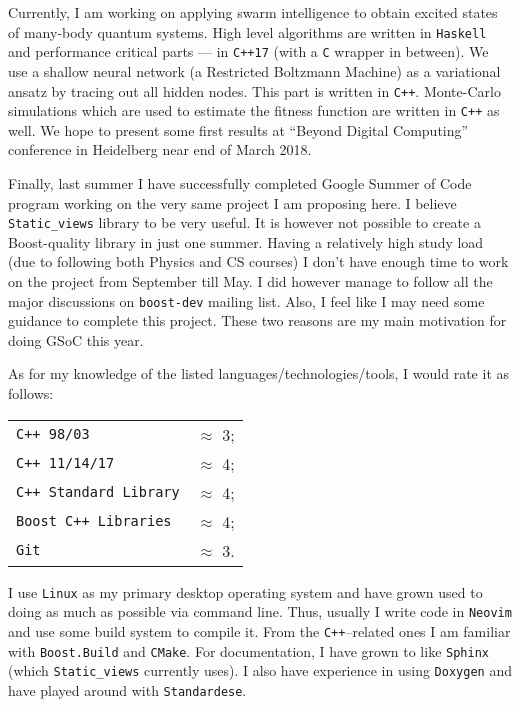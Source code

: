 \documentclass[a4paper,12pt]{article}
\begin{document}
    Currently, I am working on applying swarm intelligence to obtain excited
    states of many-body quantum systems\cite{tcm-swarm}. High level algorithms
    are written in \texttt{Haskell} and performance critical parts --- in
    \texttt{C++17} (with a \texttt{C} wrapper in between). We use a shallow
    neural network (a Restricted Boltzmann Machine) as a variational ansatz by
    tracing out all hidden nodes. This part is written in \texttt{C++}.
    Monte-Carlo simulations which are used to estimate the fitness function are
    written in \texttt{C++} as well. We hope to present some first results at
    ``Beyond Digital Computing'' conference in Heidelberg near end of March
    2018.

    Finally, last summer I have successfully completed Google Summer of Code
    program working on the very same project I am proposing here. I believe
    \texttt{Static\_views} library to be very useful. It is however not possible
    to create a Boost-quality library in just one summer. Having a relatively
    high study load (due to following both Physics and CS courses) I don't have
    enough time to work on the project from September till May. I did however
    manage to follow all the major discussions on \texttt{boost-dev} mailing
    list. Also, I feel like I may need some guidance to complete this project.
    These two reasons are my main motivation for doing GSoC this year.

    As for my knowledge of the listed languages/technologies/tools, I would rate
    it as follows:

    \begin{tabular}{l r}
        \texttt{C++ 98/03} & $\approx$ 3; \\
        \texttt{C++ 11/14/17} & $\approx$ 4; \\
        \texttt{C++ Standard Library} & $\approx$ 4; \\
        \texttt{Boost C++ Libraries} & $\approx$ 4; \\
        \texttt{Git} & $\approx$ 3.
    \end{tabular}

    I use \texttt{Linux} as my primary desktop operating system and have grown
    used to doing as much as possible via command line. Thus, usually I write
    code in \texttt{Neovim} and use some build system to compile it. From the
    \texttt{C++}--related ones I am familiar with \texttt{Boost.Build} and
    \texttt{CMake}. For documentation, I have grown to like \texttt{Sphinx}
    (which \texttt{Static\_views} currently uses). I also have experience in
    using \texttt{Doxygen} and have played around with \texttt{Standardese}.
\end{document}
